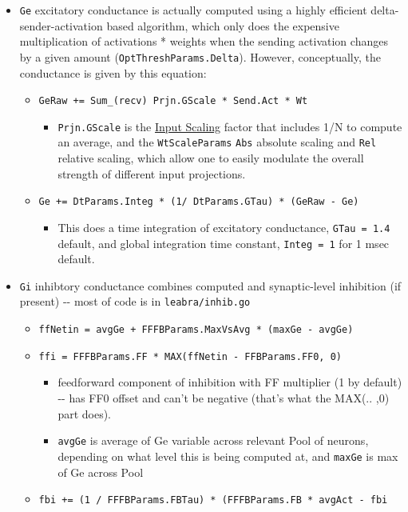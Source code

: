 \begin{itemize}
\item
  \texttt{Ge} excitatory conductance is actually computed using a highly
  efficient delta-sender-activation based algorithm, which only does the
  expensive multiplication of activations * weights when the sending
  activation changes by a given amount (\texttt{OptThreshParams.Delta}).
  However, conceptually, the conductance is given by this equation:

  \begin{itemize}
  \tightlist
  \item
    \texttt{GeRaw\ +=\ Sum\_(recv)\ Prjn.GScale\ *\ Send.Act\ *\ Wt}

    \begin{itemize}
    \tightlist
    \item
      \texttt{Prjn.GScale} is the
      \protect\hyperlink{input-scaling}{Input Scaling} factor that
      includes 1/N to compute an average, and the \texttt{WtScaleParams}
      \texttt{Abs} absolute scaling and \texttt{Rel} relative scaling,
      which allow one to easily modulate the overall strength of
      different input projections.
    \end{itemize}
  \item
    \texttt{Ge\ +=\ DtParams.Integ\ *\ (1/\ DtParams.GTau)\ *\ (GeRaw\ -\ Ge)}

    \begin{itemize}
    \tightlist
    \item
      This does a time integration of excitatory conductance,
      \texttt{GTau\ =\ 1.4} default, and global integration time
      constant, \texttt{Integ\ =\ 1} for 1 msec default.
    \end{itemize}
  \end{itemize}
\item
  \texttt{Gi} inhibtory conductance combines computed and synaptic-level
  inhibition (if present) -\/- most of code is in
  \texttt{leabra/inhib.go}

  \begin{itemize}
  \tightlist
  \item
    \texttt{ffNetin\ =\ avgGe\ +\ FFFBParams.MaxVsAvg\ *\ (maxGe\ -\ avgGe)}
  \item
    \texttt{ffi\ =\ FFFBParams.FF\ *\ MAX(ffNetin\ -\ FFBParams.FF0,\ 0)}

    \begin{itemize}
    \tightlist
    \item
      feedforward component of inhibition with FF multiplier (1 by
      default) -\/- has FF0 offset and can't be negative (that's what
      the MAX(.. ,0) part does).
    \item
      \texttt{avgGe} is average of Ge variable across relevant Pool of
      neurons, depending on what level this is being computed at, and
      \texttt{maxGe} is max of Ge across Pool
    \end{itemize}
  \item
    \texttt{fbi\ +=\ (1\ /\ FFFBParams.FBTau)\ *\ (FFFBParams.FB\ *\ avgAct\ -\ fbi}


\end{itemize}
\end{itemize}
